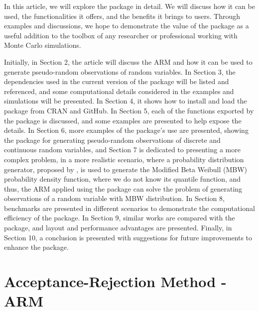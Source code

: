 In this article, we will explore the  package in detail. We will discuss how it can be used, the functionalities it offers, and the benefits it brings to users. Through examples and discussions, we hope to demonstrate the value of the  package as a useful addition to the toolbox of any researcher or professional working with Monte Carlo simulations.

Initially, in Section 2, the article will discuss the ARM and how it can be used to generate pseudo-random observations of random variables. In Section 3, the dependencies used in the current version of the package will be listed and referenced, and some computational details considered in the examples and simulations will be presented. In Section 4, it shows how to install and load the package from CRAN and GitHub. In Section 5, each of the functions exported by the  package is discussed, and some examples are presented to help expose the details. In Section 6, more examples of the package's use are presented, showing the package for generating pseudo-random observations of discrete and continuous random variables, and Section 7 is dedicated to presenting a more complex problem, in a more realistic scenario, where a probability distribution generator, proposed by \citet{nadarajah2014modified}, is used to generate the Modified Beta Weibull (MBW) probability density function, where we do not know its quantile function, and thus, the ARM applied using the  package can solve the problem of generating observations of a random variable with MBW distribution. In Section 8, benchmarks are presented in different scenarios to demonstrate the computational efficiency of the package. In Section 9, similar works are compared with the  package, and layout and performance advantages are presented. Finally, in Section 10, a conclusion is presented with suggestions for future improvements to enhance the package.

\section{Acceptance-Rejection Method - ARM}\label{acceptance-rejection-method---arm}


